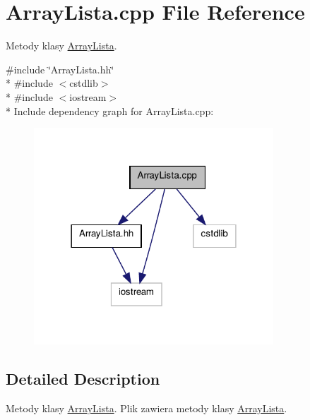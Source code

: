 \hypertarget{a00006}{\section{Array\-Lista.\-cpp File Reference}
\label{a00006}
}


Metody klasy \hyperlink{a00001}{Array\-Lista}.  


{\ttfamily \#include \char`\"{}Array\-Lista.\-hh\char`\"{}}\\*
{\ttfamily \#include $<$cstdlib$>$}\\*
{\ttfamily \#include $<$iostream$>$}\\*
Include dependency graph for Array\-Lista.\-cpp\-:\nopagebreak
\begin{figure}[H]
\begin{center}
\leavevmode
\includegraphics[width=254pt]{a00019}
\end{center}
\end{figure}


\subsection{Detailed Description}
Metody klasy \hyperlink{a00001}{Array\-Lista}. Plik zawiera metody klasy \hyperlink{a00001}{Array\-Lista}. 